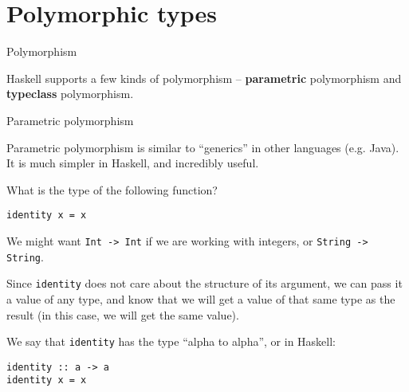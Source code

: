
\section{Polymorphic types}

%
\begin{frame}[fragile]{Polymorphism}

Haskell supports a few kinds of polymorphism -- \textbf{parametric} polymorphism
and \textbf{typeclass} polymorphism.

\end{frame}

%
\begin{frame}[fragile]{Parametric polymorphism}

Parametric polymorphism is similar to ``generics'' in other languages (e.g.
Java). It is much simpler in Haskell, and incredibly useful.

What is the type of the following function?

\begin{verbatim}
identity x = x
\end{verbatim}

We might want \texttt{Int -> Int} if we are working with integers, or
\texttt{String -> String}.

Since \texttt{identity} does not care about the structure of its argument, we
can pass it a value of any type, and know that we will get a value of that same
type as the result (in this case, we will get the same value).

We say that \texttt{identity} has the type ``alpha to alpha'', or in Haskell:

\begin{verbatim}
identity :: a -> a
identity x = x
\end{verbatim}

\end{frame}



